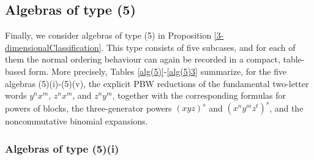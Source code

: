 \documentclass{amsart}
\theoremstyle{definition}
\theoremstyle{remark}
\numberwithin{equation}{section}
\begin{document}
\subsection{Algebras of type (5)}

Finally, we consider algebras of type (5) in Proposition \ref{3-dimensionalClassification}. This type consists of five subcases, and for each of them the normal ordering behaviour can again be recorded in a compact, table-based form. More precisely, Tables \ref{alg(5)}-\ref{alg(5)3} summarize, for the five algebras (5)(i)-(5)(v), the explicit PBW reductions of the fundamental two-letter words $y^n x^m$, $z^n x^m$, and $z^n y^m$, together with the corresponding formulas for powers of blocks, the three-generator powers $(xyz)^s$ and $(x^n y^m z^t)^s$, and the noncommutative binomial expansions.


\subsubsection{Algebras of type (5)(i)}
\end{document}
